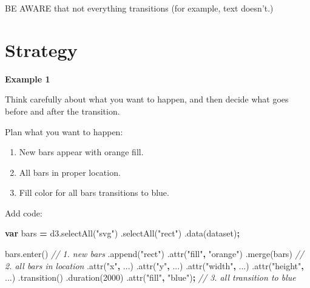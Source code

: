 \documentclass[openany]{book}
\newenvironment{Shaded}{\begin{snugshade}}{\end{snugshade}}
\newcommand{\AttributeTok}[1]{\textcolor[rgb]{0.77,0.63,0.00}{#1}}
\newcommand{\CommentTok}[1]{\textcolor[rgb]{0.56,0.35,0.01}{\textit{#1}}}
\newcommand{\DecValTok}[1]{\textcolor[rgb]{0.00,0.00,0.81}{#1}}
\newcommand{\KeywordTok}[1]{\textcolor[rgb]{0.13,0.29,0.53}{\textbf{#1}}}
\newcommand{\NormalTok}[1]{#1}
\newcommand{\OperatorTok}[1]{\textcolor[rgb]{0.81,0.36,0.00}{\textbf{#1}}}
\newcommand{\StringTok}[1]{\textcolor[rgb]{0.31,0.60,0.02}{#1}}
\newcommand{\VariableTok}[1]{\textcolor[rgb]{0.00,0.00,0.00}{#1}}
\begin{document}
BE AWARE that not everything transitions (for example, text doesn't.)

\hypertarget{strategy}{%
\section{Strategy}\label{strategy}}

\textbf{Example 1}

Think carefully about what you want to happen, and then decide what goes before and after the transition.

Plan what you want to happen:

\begin{enumerate}
\def\labelenumi{\arabic{enumi}.}
\item
  New bars appear with orange fill.
\item
  All bars in proper location.
\item
  Fill color for all bars transitions to blue.
\end{enumerate}

Add code:

\begin{Shaded}
\begin{Highlighting}[]

\KeywordTok{var}\NormalTok{ bars }\OperatorTok{=} \VariableTok{d3}\NormalTok{.}\AttributeTok{selectAll}\NormalTok{(}\StringTok{"svg"}\NormalTok{)}
\NormalTok{  .}\AttributeTok{selectAll}\NormalTok{(}\StringTok{"rect"}\NormalTok{)}
\NormalTok{  .}\AttributeTok{data}\NormalTok{(dataset)}\OperatorTok{;}
  
\VariableTok{bars}\NormalTok{.}\AttributeTok{enter}\NormalTok{()                  }\CommentTok{// 1. new bars}
\NormalTok{  .}\AttributeTok{append}\NormalTok{(}\StringTok{"rect"}\NormalTok{)}
\NormalTok{    .}\AttributeTok{attr}\NormalTok{(}\StringTok{"fill"}\OperatorTok{,} \StringTok{"orange"}\NormalTok{)}
\NormalTok{  .}\AttributeTok{merge}\NormalTok{(bars)                }\CommentTok{// 2. all bars in location}
\NormalTok{    .}\AttributeTok{attr}\NormalTok{(}\StringTok{"x"}\OperatorTok{,}\NormalTok{ ...)}
\NormalTok{    .}\AttributeTok{attr}\NormalTok{(}\StringTok{"y"}\OperatorTok{,}\NormalTok{ ...)}
\NormalTok{    .}\AttributeTok{attr}\NormalTok{(}\StringTok{"width"}\OperatorTok{,}\NormalTok{ ...)}
\NormalTok{    .}\AttributeTok{attr}\NormalTok{(}\StringTok{"height"}\OperatorTok{,}\NormalTok{ ...)}
\NormalTok{  .}\AttributeTok{transition}\NormalTok{()}
\NormalTok{  .}\AttributeTok{duration}\NormalTok{(}\DecValTok{2000}\NormalTok{)}
\NormalTok{    .}\AttributeTok{attr}\NormalTok{(}\StringTok{"fill"}\OperatorTok{,} \StringTok{"blue"}\NormalTok{)}\OperatorTok{;}   \CommentTok{// 3. all transition to blue}
\end{Highlighting}
\end{Shaded}
\end{document}
